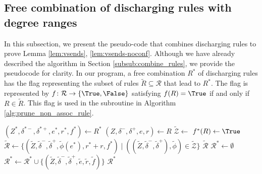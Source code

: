 \documentclass[main.tex]{subfiles}
\begin{document}
\subsection{Free combination of discharging rules with degree ranges}
\newcommand{\addRuleToCombination}{\texttt{addRuleToCombination}\xspace}
\newcommand{\combineRules}{\texttt{combineRules}\xspace}
In this subsection, we present the pseudo-code that combines discharging rules to prove Lemma \ref{lem:vsends}, \ref{lem:vsends-noconf}.
Although we have already described the algorithm in Section \ref{subsub:combine_rules}, we provide the pseudocode for clarity.
In our \Cpp program, a free combination $R^*$ of discharging rules has the flag representing the subset of rules $\tilde{R} \subseteq \mathcal{R}$ that lead to $R^*$.
The flag is represented by $f \colon \mathcal{R} \to \{\True, \False\}$ satisfying $f(R)=\True$ if and only if $R \in \tilde{R}$.
This flag is used in the \pruneByNonAssociatedRule subroutine in Algorithm \ref{alg:prune_non_assoc_rule}.

\begin{algorithm}[H]
    \caption{\addRuleToCombinationWithLink($R^*, R, \mathcal{K}$)}
    \label{alg:add_rule}
    \begin{algorithmic}[1]

        \State $(Z^*, \delta^{*-}, \delta^{*+}, e^*, r^*, f^*) \gets R^*$
        \State $(Z, \delta^-, \delta^+, e, r) \gets R$
        \State $\tilde{\mathcal{Z}} \gets$ 
        \State $f^*(R) \gets \True$
        \State $\tilde{\mathcal{R}} \gets \{(\tilde{Z}, \tilde{\delta}^{-}, \tilde{\delta}^{+}, \tilde{\phi}(e^*), r^* + r, f^*) \mid ((\tilde{Z}, \tilde{\delta}^{-}, \tilde{\delta}^{+}), \tilde{\phi}) \in \tilde{\mathcal{Z}}\}$
            \State \Return $\tilde{\mathcal{R}}$
        \EndIf
        \State $\mathcal{R}^* \gets \emptyset$
                \Continue
            \EndIf
            \State $\mathcal{R}^* \gets \mathcal{R}^* \cup \{(\tilde{Z}, \tilde{\delta}^{-}, \tilde{\delta}^{+}, \tilde{e}, \tilde{r}, \tilde{f})\}$
        \EndFor
        \State \Return $\mathcal{R}^*$
    \end{algorithmic}
\end{algorithm}
\end{document}
